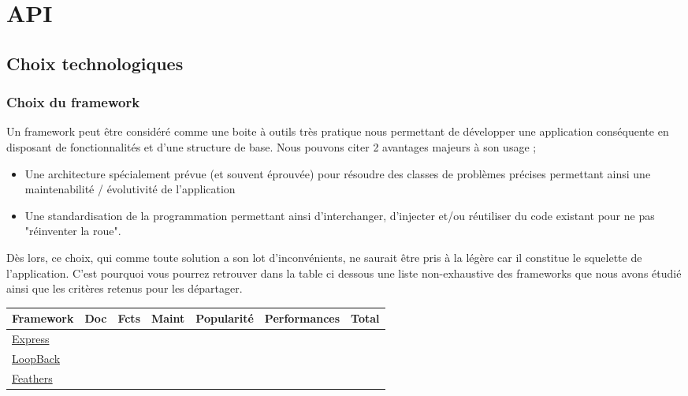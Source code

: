 \clearpage
\section{API}
\subsection{Choix technologiques}

\subsubsection*{Choix du framework}

Un framework peut être considéré comme une boite à outils très pratique nous permettant de développer une application conséquente en disposant de fonctionnalités et d'une structure de base. Nous pouvons citer 2 avantages majeurs à son usage ; 
\begin{itemize}
    \item Une architecture spécialement prévue (et souvent éprouvée) pour résoudre des classes de problèmes précises permettant ainsi une maintenabilité / évolutivité  de l'application
    \item Une standardisation de la programmation permettant ainsi d'interchanger, d'injecter et/ou réutiliser du code existant pour ne pas "réinventer la roue".
\end{itemize}
Dès lors, ce choix, qui comme toute solution a son lot d'inconvénients, ne saurait être pris à la légère car il constitue le squelette de l'application. C'est pourquoi vous pourrez retrouver dans la table ci dessous une liste non-exhaustive des frameworks que nous avons étudié ainsi que les critères retenus pour les départager. 

\begin{center}
\begin{tabular}{| l | l | l | l | l | l | l |}
\hline
Framework & Doc & Fcts & Maint & Popularité & Performances & Total \\
\hline
    \href{https://expressjs.com/}{Express} &
    &  
    &
    &            
    &              
    &       \\
\hline
    \href{https://loopback.io/}{LoopBack} &
    &                
    &   
    &
    &              
    &       \\
\hline
    \href{https://feathersjs.com/}{Feathers} &
    &                
    &     
    &
    &              
    &       \\  
\hline
\end{tabular}
\end{center}
\thinspace %

